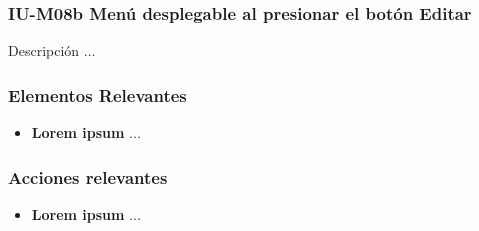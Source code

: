 
\subsubsection{IU-M08b Menú desplegable al presionar el botón Editar}

 Descripción ...


\subsubsection{Elementos Relevantes}

    \begin{itemize}
    \item {\bf Lorem ipsum}
        ...
    \end{itemize}

\subsubsection{Acciones relevantes}

    \begin{itemize}
    \item {\bf Lorem ipsum}
        ...
    \end{itemize}

\clearpage
